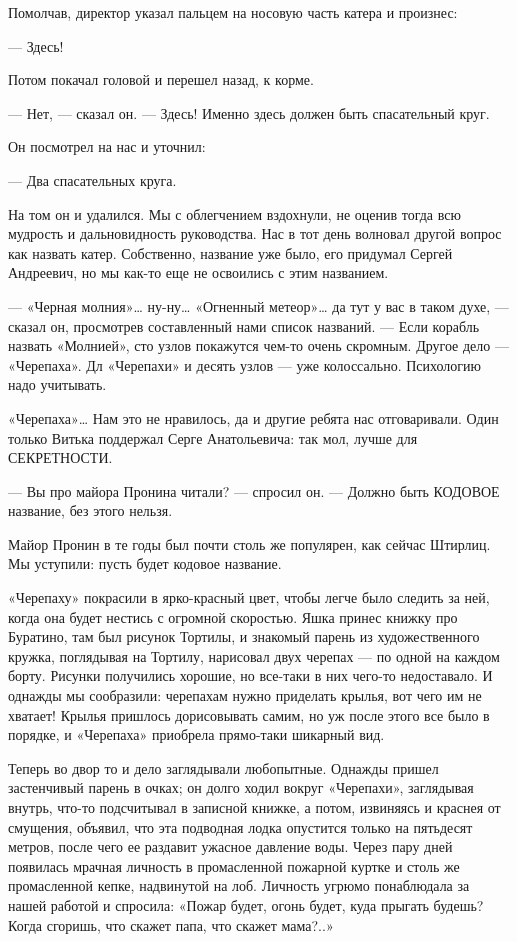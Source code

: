 Помолчав, директор указал пальцем на носовую часть катера и произнес:

— Здесь!

Потом покачал головой и перешел назад, к корме.

— Нет, — сказал он. — Здесь! Именно здесь должен быть спасательный круг.

Он посмотрел на нас и уточнил:

— Два спасательных круга.

На том он  и удалился.  Мы с облегчением  вздохнули, не  оценив тогда  всю
мудрость и  дальновидность руководства.  Нас в  тот день  волновал  другой
вопрос как  назвать катер.  Собственно, название  уже было,  его  придумал
Сергей Андреевич, но мы как-то еще не освоились с этим названием.

— «Черная молния»… ну-ну… «Огненный метеор»… да тут у вас в таком духе,  —
сказал он, просмотрев  составленный нами список  названий. — Если  корабль
назвать «Молнией», сто узлов покажутся чем-то очень скромным. Другое  дело
— «Черепаха». Дл «Черепахи» и  десять узлов — уже колоссально.  Психологию
надо учитывать.

«Черепаха»… Нам это  не нравилось,  да и другие  ребята нас  отговаривали.
Один только  Витька  поддержал  Серге Анатольевича:  так  мол,  лучше  для
СЕКРЕТНОСТИ.

— Вы  про майора  Пронина читали?  —  спросил он.  — Должно  быть  КОДОВОЕ
название, без этого нельзя.

Майор Пронин в те годы был  почти столь же популярен, как сейчас  Штирлиц.
Мы уступили: пусть будет кодовое название.

«Черепаху» покрасили в ярко-красный цвет, чтобы легче было следить за ней,
когда она  будет нестись  с  огромной скоростью.  Яшка принес  книжку  про
Буратино, там был  рисунок Тортилы, и  знакомый парень из  художественного
кружка, поглядывая на Тортилу, нарисовал двух черепах — по одной на каждом
борту. Рисунки получились хорошие, но все-таки в них чего-то  недоставало.
И однажды мы сообразили: черепахам нужно приделать крылья, вот чего им  не
хватает! Крылья пришлось дорисовывать самим, но уж после этого все было  в
порядке, и «Черепаха» приобрела прямо-таки шикарный вид.

Теперь  во  двор  то  и   дело  заглядывали  любопытные.  Однажды   пришел
застенчивый парень в очках; он  долго ходил вокруг «Черепахи»,  заглядывая
внутрь, что-то подсчитывал в записной книжке, а потом, извиняясь и краснея
от  смущения,  объявил,  что  эта  подводная  лодка  опустится  только  на
пятьдесят метров, после чего ее раздавит ужасное давление воды. Через пару
дней появилась мрачная личность в промасленной пожарной куртке и столь  же
промасленной кепке,  надвинутой на  лоб.  Личность угрюмо  понаблюдала  за
нашей работой и спросила: «Пожар будет, огонь будет, куда прыгать  будешь?
Когда сгоришь, что скажет папа, что скажет мама?..»

